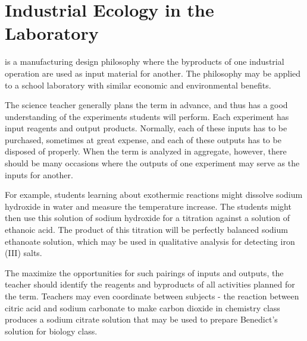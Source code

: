 \chapter{Industrial Ecology in the Laboratory}

 is a manufacturing design philosophy 
where the byproducts of one industrial operation 
are used as input material for another. 
The philosophy may be applied to a school laboratory 
with similar economic and environmental benefits.

The science teacher generally plans the term in advance, 
and thus has a good understanding of the experiments students will perform. 
Each experiment has input reagents and output products. 
Normally, 
each of these inputs has to be purchased, 
sometimes at great expense, 
and each of these outputs has to be disposed of properly. 
When the term is analyzed in aggregate, 
however, 
there should be many occasions where the outputs of one experiment 
may serve as the inputs for another.

For example, 
students learning about exothermic reactions might 
dissolve sodium hydroxide in water and measure the temperature increase. 
The students might then use this solution 
of sodium hydroxide for a titration against a solution of ethanoic acid. 
The product of this titration will be 
perfectly balanced sodium ethanoate solution, 
which may be used in qualitative analysis for detecting iron (III) salts.

The maximize the opportunities for such pairings of inputs and outputs, 
the teacher should identify the reagents and byproducts of 
all activities planned for the term. 
Teachers may even coordinate between subjects - 
the reaction between citric acid and sodium carbonate 
to make carbon dioxide in chemistry class 
produces a sodium citrate solution that may be used 
to prepare Benedict's solution for biology class.
